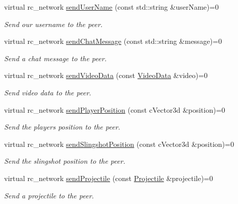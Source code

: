 \begin{DoxyCompactItemize}
virtual rc\_\-network \hyperlink{classNetwork_a741e75b2e9adfc188c53e150b4dd4610}{sendUserName} (const std::string \&userName)=0
\begin{DoxyCompactList}\small\item\em Send our username to the peer. \item\end{DoxyCompactList}\item 
virtual rc\_\-network \hyperlink{classNetwork_aa5e1e44e3cb4862b2c343999c89ce3b5}{sendChatMessage} (const std::string \&message)=0
\begin{DoxyCompactList}\small\item\em Send a chat message to the peer. \item\end{DoxyCompactList}\item 
virtual rc\_\-network \hyperlink{classNetwork_a189df8819d21d4f1a277ca753453045b}{sendVideoData} (const \hyperlink{structVideoData}{VideoData} \&video)=0
\begin{DoxyCompactList}\small\item\em Send video data to the peer. \item\end{DoxyCompactList}\item 
virtual rc\_\-network \hyperlink{classNetwork_a9a2eb94c34d8d93f7490184cd2526e62}{sendPlayerPosition} (const cVector3d \&position)=0
\begin{DoxyCompactList}\small\item\em Send the players position to the peer. \item\end{DoxyCompactList}\item 
virtual rc\_\-network \hyperlink{classNetwork_aa105332ed8a1325a89f1f3e0a9d27521}{sendSlingshotPosition} (const cVector3d \&position)=0
\begin{DoxyCompactList}\small\item\em Send the slingshot position to the peer. \item\end{DoxyCompactList}\item 
virtual rc\_\-network \hyperlink{classNetwork_a477324500341f146fc7fc7411290a424}{sendProjectile} (const \hyperlink{classProjectile}{Projectile} \&projectile)=0
\begin{DoxyCompactList}\small\item\em Send a projectile to the peer. \item\end{DoxyCompactList}\item 

\end{DoxyCompactItemize}
